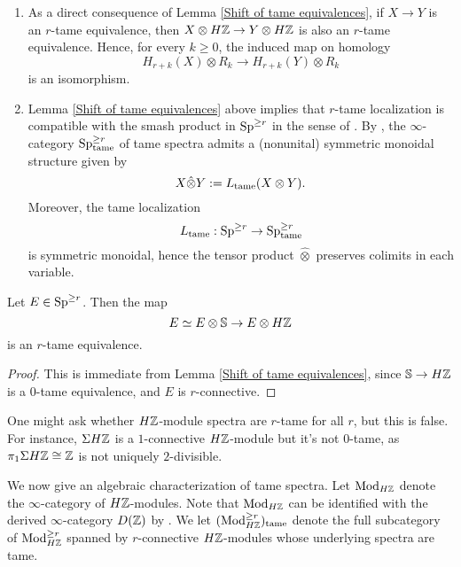 \begin{remark}
\label{symmetric monoidal structure on tame spectra}
\begin{enumerate}
 	\item As a direct consequence of Lemma \ref{Shift of tame equivalences}, if $X\to Y$ is an $r$-tame equivalence, then $X\otimes H{\mathbb{Z}} \to Y\otimes H{\mathbb{Z}}$ is also an $r$-tame equivalence. Hence, for every $k\geq 0$, the induced map on homology
 	\[
 	H_{r+k}(X)\otimes R_{k}
 	\to
 	H_{r+k}(Y)\otimes R_{k}
 	\]
 	is an isomorphism.
	\item Lemma \ref{Shift of tame equivalences} above implies that $r$-tame localization is compatible with the smash product in $\operatorname{Sp}^{\geq r}$ in the sense of \cite[Definition 2.2.1.6.]{HA}. By \cite[Proposition 2.2.1.9.]{HA}, the $\infty$-category $\operatorname{Sp}^{\geq r}_{\operatorname{\operatorname{tame}}}$ of tame spectra admits a (nonunital) symmetric monoidal structure given by 
$$
X\hat{\otimes} Y := L_{\operatorname{\operatorname{tame}}}(X\otimes Y).
$$
Moreover, the tame localization 
$$
L_{\operatorname{\operatorname{tame}}}: \operatorname{Sp}^{\geq r} \to 
\operatorname{Sp}^{\geq r}_{\operatorname{\operatorname{tame}}}
$$
is symmetric monoidal, hence the tensor product $\hat{\otimes}$ preserves colimits in each variable.
\end{enumerate}

\end{remark}

\begin{corollary}
\label{HZ commutes with tame localization}
	Let $E\in \operatorname{Sp}^{\geq r}$. Then the map
	$$
	E \simeq E\otimes {\mathbb{S}}  \to E\otimes H{\mathbb{Z}}
	$$ 
	is an $r$-tame equivalence.
\end{corollary}
\begin{proof}
	This is immediate from Lemma \ref{Shift of tame equivalences}, since ${\mathbb{S}} \to H{\mathbb{Z}}$ is a $0$-tame equivalence, and $E$ is $r$-connective.
\end{proof}



One might ask whether $H{\mathbb{Z}}$-module spectra are $r$-tame for all $r$, but this is false. For instance, $\Sigma H{\mathbb{Z}}$ is a $1$-connective $H{\mathbb{Z}}$-module but it's not $0$-tame, as $\pi_{1}\Sigma H{\mathbb{Z}}\cong {\mathbb{Z}}$ is not uniquely $2$-divisible.

We now give an algebraic characterization of tame spectra. 
Let $\operatorname{Mod}_{H{\mathbb{Z}}}$ denote the $\infty$-category of $H{\mathbb{Z}}$-modules. Note that $\operatorname{Mod}_{H{\mathbb{Z}}}$ can be identified with the derived $\infty$-category $D({\mathbb{Z}})$ by \cite[Remark 7.1.1.16.]{HA}.
We let $(\operatorname{Mod}^{\geq r}_{H{\mathbb{Z}}})_{\operatorname{\operatorname{tame}}}$ denote the full subcategory of $\operatorname{Mod}^{\geq r}_{H{\mathbb{Z}}}$
spanned by $r$-connective $H{\mathbb{Z}}$-modules whose underlying spectra are tame.

